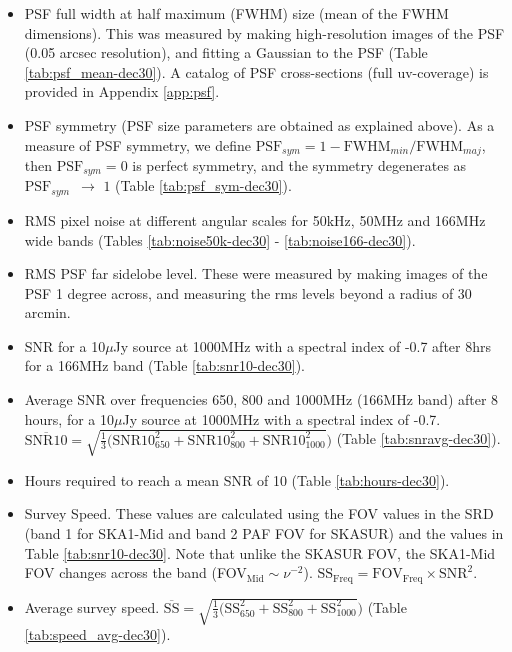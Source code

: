 \documentclass[sfheadings,a4paper,times,9pt,floats,floatfix]{article}
\begin{document}
\begin{itemize}
 \item PSF full width at half maximum (FWHM) size (mean of the FWHM dimensions). This was measured by making high-resolution
images of the PSF (0.05 arcsec resolution), and fitting a Gaussian to the PSF (Table \ref{tab:psf_mean-dec30}). A
catalog
of PSF
cross-sections (full uv-coverage) is provided in Appendix \ref{app:psf}.

 \item PSF symmetry (PSF size parameters are obtained as explained above). As a measure of PSF symmetry, we define 
$\text{PSF}_{sym}=1-\text{FWHM}_{min}/\text{FWHM}_{maj}$, then $\text{PSF}_{sym} = 0$ is perfect symmetry, and the symmetry
degenerates as $\text{PSF}_{sym}\,\,\, \rightarrow\,\,1$ (Table \ref{tab:psf_sym-dec30}).

 \item RMS pixel noise at different angular scales for 50kHz, 50MHz and 166MHz wide bands (Tables
\ref{tab:noise50k-dec30} -
\ref{tab:noise166-dec30}).

\item RMS PSF far sidelobe level. These were measured by making images of the PSF 1 degree across, and measuring
the rms levels beyond a radius of 30 arcmin.

 \item SNR for a 10$\mu$Jy source at 1000MHz with a spectral index of -0.7 after 8hrs for a 166MHz band (Table
\ref{tab:snr10-dec30}).
 
 \item Average SNR over frequencies 650, 800 and 1000MHz (166MHz band) after 8 hours, for a 10$\mu$Jy source at 1000MHz
with a
spectral index of -0.7. {$\overline{\text{SNR10}}=\sqrt{\frac{1}{3}(\text{SNR10}_{650}^2 + \text{SNR10}_{800}^2
+\text{SNR10}_{1000}^2})$} (Table \ref{tab:snravg-dec30}).

 \item Hours required to reach a mean SNR of 10 (Table \ref{tab:hours-dec30}).
 
 \item Survey Speed. These values are calculated using the FOV values in the SRD (band 1 for SKA1-Mid and band 2 PAF FOV
for
SKASUR) and the values in Table \ref{tab:snr10-dec30}. Note that unlike the SKASUR FOV, the SKA1-Mid FOV changes across
the band
(FOV$_{\text{Mid}}\sim \nu^{-2}$). $\text{SS}_\text{Freq} = \text{FOV}_\text{Freq}\times \text{SNR}^2$. 
 \item Average survey speed. {$\overline{\text{SS}} =\sqrt{\frac{1}{3}(\text{SS}_{650}^2 + \text{SS}_{800}^2
+\text{SS}_{1000}^2})$} (Table \ref{tab:speed_avg-dec30}).
\end{itemize}
\end{document}
